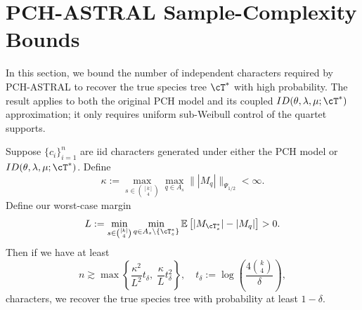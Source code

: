 \section{PCH-ASTRAL Sample-Complexity Bounds}
\label{sec:pch_astral_sample_complexity}

In this section, we bound the number of independent characters required by PCH-ASTRAL
to recover the true species tree $\cT^*$ with high probability. The result applies to both
the original PCH model and its coupled $ID(\theta,\lambda,\mu;\cT^*)$ approximation; it only
requires uniform sub-Weibull control of the quartet supports.

\begin{lemma}
\label{lem:sample_complexity_pch_astral}
    Suppose $\{c_i\}_{i=1}^n$ are iid characters generated under either the PCH model or
    $ID(\theta,\lambda,\mu;\cT^*)$. Define
    \[\kappa:=\max_{s\in{[k]\choose4}}\max_{q\in A_s}
    \bigl\||M_q|\bigr\|_{\Psi_{1/2}}<\infty.\]
    \noindent Define our worst-case margin
        \[
            L:=\min_{s\in {[k]\choose 4}}\min_{q\in A_s\setminus\{\cT_s^*\}}\E\left[|M_{\cT_s^*}|-|M_q|\right]>0.
        \]
    \noindent Then if we have at least
    \[n \gtrsim \max\left\{\frac{\kappa^2}{L^2} t_\delta, \; \frac{\kappa}{L} t_\delta^2 \right\}, \quad t_\delta := \log\left(\frac{4{k \choose 4}}{\delta} \right), \]
    \noindent characters, we recover the true species tree with probability at least $1-\delta$.
\end{lemma}


